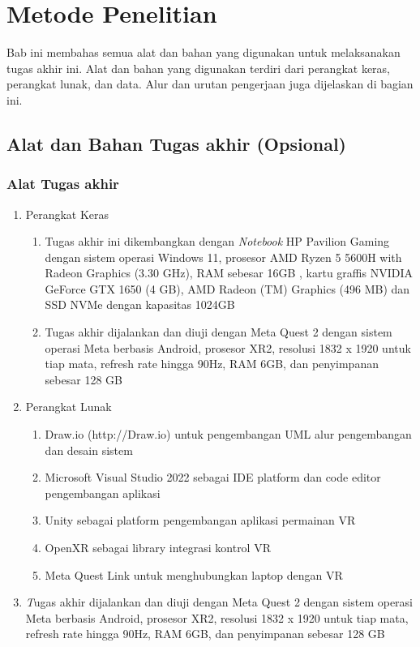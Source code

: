 \chapter{Metode Penelitian}

Bab ini membahas semua alat dan bahan yang digunakan untuk melaksanakan tugas akhir ini. Alat dan bahan yang digunakan terdiri dari perangkat keras, perangkat lunak, dan data. Alur dan urutan pengerjaan juga dijelaskan di bagian ini.

\section{Alat dan Bahan Tugas akhir (Opsional)}

\subsection{Alat Tugas akhir}

\begin{enumerate} 

	\item Perangkat Keras
	\begin{enumerate}
	\item Tugas akhir ini dikembangkan dengan \textit{Notebook} HP Pavilion Gaming dengan sistem operasi Windows 11, prosesor AMD Ryzen 5 5600H with Radeon Graphics (3.30 GHz), RAM sebesar 16GB , kartu graffis NVIDIA GeForce GTX 1650 (4 GB), AMD Radeon (TM) Graphics (496 MB) dan SSD NVMe dengan kapasitas 1024GB
	\item Tugas akhir dijalankan dan diuji dengan Meta Quest 2 dengan sistem operasi Meta berbasis Android, prosesor XR2, resolusi 1832 x 1920 untuk tiap mata, refresh rate hingga 90Hz, RAM 6GB, dan penyimpanan sebesar 128 GB
	\end{enumerate}

	\item Perangkat Lunak
	\begin{enumerate}
		\item Draw.io (http://Draw.io) untuk pengembangan UML alur pengembangan dan desain sistem
		\item Microsoft Visual Studio 2022 sebagai IDE platform dan code editor pengembangan aplikasi
		\item Unity sebagai platform pengembangan aplikasi permainan VR
		\item OpenXR sebagai library integrasi kontrol VR
		\item Meta Quest Link untuk menghubungkan laptop dengan VR
	\end{enumerate}
	\item \textit Tugas akhir dijalankan dan diuji dengan Meta Quest 2 dengan sistem operasi Meta berbasis Android, prosesor XR2, resolusi 1832 x 1920 untuk tiap mata, refresh rate hingga 90Hz, RAM 6GB, dan penyimpanan sebesar 128 GB
	
\end{enumerate}


